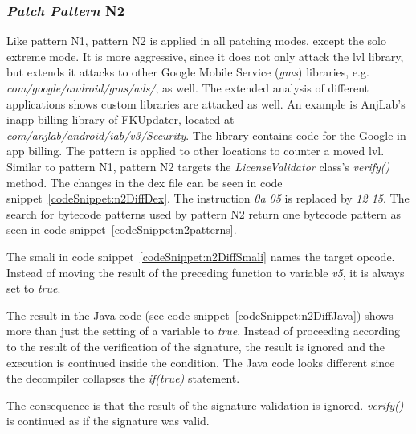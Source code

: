 \subsubsection{\textit{Patch Pattern} N2}
Like pattern N1, pattern N2 is applied in all patching modes, except the solo extreme mode.
It is more aggressive, since it does not only attack the \gls{lvl} library, but extends it attacks to other Google Mobile Service (\textit{gms}) libraries, e.g.  \textit{com/google/android/gms/ads/}, as well.
The extended analysis of different applications shows custom libraries are attacked as well.
An example is AnjLab's inapp billing library \cite{inappBilling} of FKUpdater, located at \textit{com/anjlab/android/iab/v3/Security}.
The library contains code for the Google in app billing.
The pattern is applied to other locations to counter a moved \gls{lvl}.
Similar to pattern N1, pattern N2 targets the \textit{LicenseValidator} class's \textit{verify()} method.
\newline
The changes in the \gls{dex} file can be seen in code snippet~\ref{codeSnippet:n2DiffDex}.
The instruction \textit{0a 05} is replaced by \textit{12 15}.
\newline
The search for bytecode patterns used by pattern N2 return one bytecode pattern as seen in code snippet~\ref{codeSnippet:n2patterns}.
\newline

The smali in code snippet~\ref{codeSnippet:n2DiffSmali} names the target opcode.
Instead of moving the result of the preceding function to variable \textit{v5}, it is always set to \textit{true}.
\newline

The result in the Java code (see code snippet~\ref{codeSnippet:n2DiffJava}) shows more than just the setting of a variable to \textit{true}.
Instead of proceeding according to the result of the verification of the signature, the result is ignored and the execution is continued inside the condition.
The Java code looks different since the decompiler collapses the \textit{if(true)} statement.
\newline

The consequence is that the result of the signature validation is ignored.
\textit{verify()} is continued as if the signature was valid.

